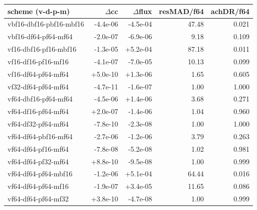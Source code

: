 \begin{tabular}{lrrrr}
\toprule
scheme (v-d-p-m) & $\Delta$cc & $\Delta$flux & resMAD/f64 & achDR/f64 \\
\midrule
vbf16-dbf16-pbf16-mbf16 & -4.4e-06 & -4.5e-04 & 47.48 & 0.021 \\
vbf16-df64-pf64-mf64 & -2.0e-07 & -6.9e-06 & 9.18 & 0.109 \\
vf16-dbf16-pf16-mbf16 & -1.3e-05 & +5.2e-04 & 87.18 & 0.011 \\
vf16-df16-pf16-mf16 & -4.1e-07 & -7.0e-05 & 10.13 & 0.099 \\
vf16-df64-pf64-mf64 & +5.0e-10 & +1.3e-06 & 1.65 & 0.605 \\
vf32-df64-pf64-mf64 & -4.7e-11 & -1.6e-07 & 1.00 & 1.000 \\
vf64-dbf16-pf64-mf64 & -4.5e-06 & +1.4e-06 & 3.68 & 0.271 \\
vf64-df16-pf64-mf64 & +2.0e-07 & -1.4e-06 & 1.04 & 0.960 \\
vf64-df32-pf64-mf64 & -7.8e-10 & -2.3e-08 & 1.00 & 1.000 \\
vf64-df64-pbf16-mf64 & -2.7e-06 & -1.2e-06 & 3.79 & 0.263 \\
vf64-df64-pf16-mf64 & -7.8e-08 & -5.2e-08 & 1.02 & 0.981 \\
vf64-df64-pf32-mf64 & +8.8e-10 & -9.5e-08 & 1.00 & 0.999 \\
vf64-df64-pf64-mbf16 & -1.2e-06 & +5.1e-04 & 64.44 & 0.016 \\
vf64-df64-pf64-mf16 & -1.9e-07 & +3.4e-05 & 11.65 & 0.086 \\
vf64-df64-pf64-mf32 & +3.8e-10 & -4.7e-08 & 1.00 & 0.999 \\
\bottomrule
\end{tabular}